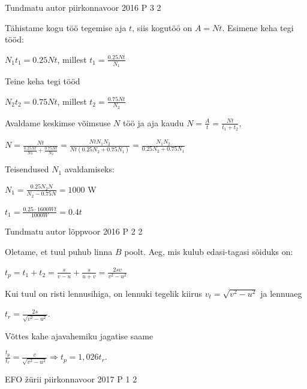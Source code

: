 \documentclass[11pt]{article}
\begin{document}
{%
{Tundmatu autor} %
{piirkonnavoor} %
{2016} %
{P 3} %
{2} %
{

\ifSolution
Tähistame kogu töö tegemise aja $t$, siis kogutöö on $A = Nt$. Esimene keha tegi tööd:
\begin{center}
$N_1 t_1 = 0.25Nt$, millest $t_1 = \frac{0.25Nt}{N_1}$
\end{center}
Teine keha tegi tööd
\begin{center}
$N_2t_2 = 0.75Nt$, millest $t_2 = \frac{0.75Nt}{N_2}$
\end{center}
Avaldame keskimse võimsuse $N$ töö ja aja kaudu $N = \frac{A}{t} = \frac{Nt}{t_1 + t_2}$,
\begin{center}
$N = \frac{Nt}{\frac{0.25Nt}{N1} + \frac{0.75Nt}{N_2}} = \frac{NtN_1 N_2}{Nt(0.25N_2 + 0.75N_1)} = \frac{N_1 N_2}{0.25N_2 + 0.75 N_1}$
\end{center}
Teisendused $N_1$ avaldamiseks:
\begin{center}
$N_1 = \frac{0.25N_2 N}{N_2 - 0.75N} = 1000$ W
\end{center}
\begin{center}
$t_1 = \frac{0.25 \cdot 1600 Wt}{1000 W} = 0.4t$
\end{center}
\fi
}

{Tundmatu autor} %
{lõppvoor} %
{2016} %
{P 2} %
{2} %
{

\ifSolution
Oletame, et tuul puhub linna $B$ poolt. Aeg, mis kulub edasi-tagasi sõiduks on:
\begin{center}
$t_p = t_1 + t_2 = \frac{s}{v - u} + \frac{s}{u + v} = \frac{2sv}{v^2 - u^2}$
\end{center}
Kui tuul on risti lennusihiga, on lennuki tegelik kiirus $v_t = \sqrt{v^2 - u^2}$ ja lennuaeg
\begin{center}
$t_r = \frac{2s}{\sqrt{v^2 - u^2}}$.
\end{center}
Võttes kahe ajavahemiku jagatise saame
\begin{center}
$\frac{t_p}{t_r} = \frac{v}{\sqrt{v^2 - u^2}} \Rightarrow t_p = 1,026t_r$.
\end{center}
\fi
}

{EFO žürii} %
{piirkonnavoor} %
{2017} %
{P 1} %
{2} %
{

}}
\end{document}
